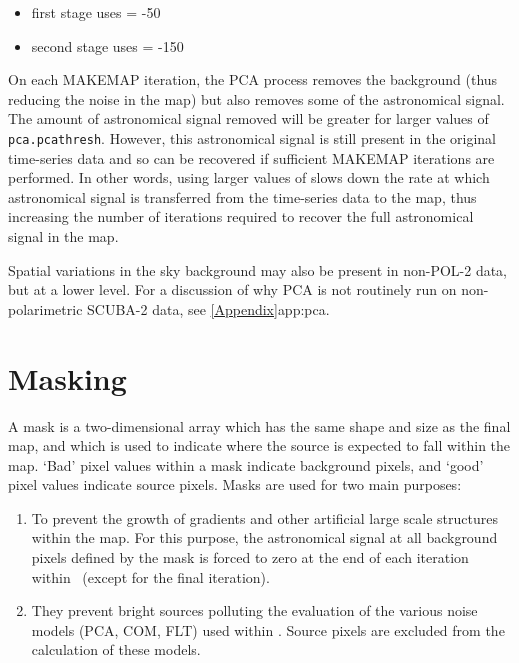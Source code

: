 \begin{itemize}
\item first stage uses  = -50
\item second stage uses  = -150
\end{itemize}

On each MAKEMAP iteration, the PCA process removes the background (thus
reducing the noise in the map) but also removes some of the astronomical
signal. The amount of astronomical signal removed will be greater for
larger values of \texttt{pca.pcathresh}. However, this astronomical
signal is still present in the original time-series data and so can be
recovered if sufficient MAKEMAP iterations are performed. In other words,
using larger values of  slows down the rate at
which astronomical signal is transferred from the time-series data to the
map, thus increasing the number of iterations required to recover the
full astronomical signal in the map.

Spatial variations in the sky background may also be present in non-POL-2
data, but at a lower level. For a discussion of why PCA is not routinely
run on non-polarimetric SCUBA-2 data, see \cref{Appendix}{app:pca}{}.



\section{Masking}
A mask is a two-dimensional array which has the same shape and size as
the final map, and which is used to indicate where the source is
expected to fall within the map. `Bad' pixel values within a mask
indicate background pixels, and `good' pixel values indicate source
pixels. Masks are used for two main purposes:

\begin{enumerate}
\item To prevent the growth of gradients and other artificial large
  scale structures within the map.  For this purpose, the astronomical
  signal at all background pixels defined by the mask is forced to
  zero at the end of each iteration within \makemap\ (except for the
  final iteration).
\item They prevent bright sources polluting the evaluation of the
  various noise models (PCA, COM, FLT) used within \makemap. Source
  pixels are excluded from the calculation of these models.
\end{enumerate}


